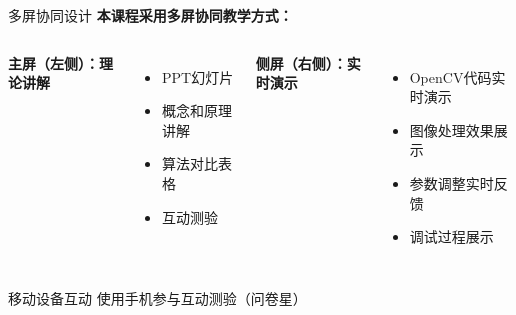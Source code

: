 \documentclass[aspectratio=169, 10pt]{beamer}
\begin{document}
\begin{frame}{多屏协同设计}
    \textbf{本课程采用多屏协同教学方式：}

    \vspace{0.3cm}

    \begin{columns}
        \textbf{主屏（左侧）：理论讲解}
        \begin{itemize}
            \item PPT幻灯片
            \item 概念和原理讲解
            \item 算法对比表格
            \item 互动测验
        \end{itemize}

        \textbf{侧屏（右侧）：实时演示}
        \begin{itemize}
            \item OpenCV代码实时演示
            \item 图像处理效果展示
            \item 参数调整实时反馈
            \item 调试过程展示
        \end{itemize}
    \end{columns}

    \vspace{0.5cm}

    \begin{block}{移动设备互动}
        使用手机参与互动测验（问卷星）
    \end{block}
\end{frame}
\end{document}
